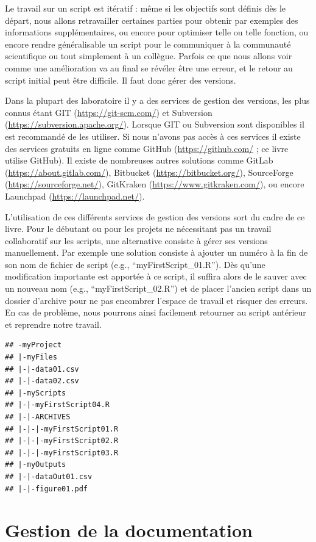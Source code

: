 \documentclass[]{book}
\begin{document}
Le travail sur un script est itératif : même si les objectifs sont définis dès le départ, nous allons retravailler certaines parties pour obtenir par exemples des informations supplémentaires, ou encore pour optimiser telle ou telle fonction, ou encore rendre généralisable un script pour le communiquer à la communauté scientifique ou tout simplement à un collègue. Parfois ce que nous allons voir comme une amélioration va au final se révéler être une erreur, et le retour au script initial peut être difficile. Il faut donc gérer des versions.

Dans la plupart des laboratoire il y a des services de gestion des versions, les plus connus étant GIT (\url{https://git-scm.com/}) et Subversion (\url{https://subversion.apache.org/}). Lorsque GIT ou Subversion sont disponibles il est recommandé de les utiliser. Si nous n'avons pas accès à ces services il existe des services gratuits en ligne comme GitHub (\url{https://github.com/} ; ce livre utilise GitHub). Il existe de nombreuses autres solutions comme GitLab (\url{https://about.gitlab.com/}), Bitbucket (\url{https://bitbucket.org/}), SourceForge (\url{https://sourceforge.net/}), GitKraken (\url{https://www.gitkraken.com/}), ou encore Launchpad (\url{https://launchpad.net/}).

L'utilisation de ces différents services de gestion des versions sort du cadre de ce livre. Pour le débutant ou pour les projets ne nécessitant pas un travail collaboratif sur les scripts, une alternative consiste à gérer ses versions manuellement. Par exemple une solution consiste à ajouter un numéro à la fin de son nom de fichier de script (e.g., ``myFirstScript\_01.R''). Dès qu'une modification importante est apportée à ce script, il suffira alors de le sauver avec un nouveau nom (e.g., ``myFirstScript\_02.R'') et de placer l'ancien script dans un dossier d'archive pour ne pas encombrer l'espace de travail et risquer des erreurs. En cas de problème, nous pourrons ainsi facilement retourner au script antérieur et reprendre notre travail.

\begin{verbatim}
## -myProject
## |-myFiles
## |-|-data01.csv
## |-|-data02.csv
## |-myScripts
## |-|-myFirstScript04.R
## |-|-ARCHIVES
## |-|-|-myFirstScript01.R
## |-|-|-myFirstScript02.R
## |-|-|-myFirstScript03.R
## |-myOutputs
## |-|-dataOut01.csv
## |-|-figure01.pdf
\end{verbatim}

\hypertarget{gestion-de-la-documentation}{%
\section{Gestion de la documentation}\label{gestion-de-la-documentation}}
\end{document}
